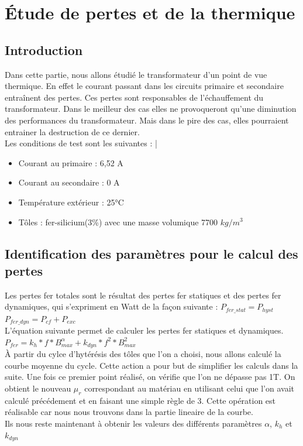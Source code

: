  
\section{Étude de pertes et de la thermique}

\subsection{Introduction}

	Dans cette partie, nous allons étudié le transformateur d'un point de vue thermique. En effet le courant passant dans les circuits primaire et secondaire entraînent des pertes. Ces pertes sont responsables de l'échauffement du transformateur. Dans le meilleur des cas elles ne provoqueront qu'une diminution des performances du transformateur. Mais dans le pire des cas, elles pourraient entrainer la destruction de ce dernier. \\
	Les conditions de test sont les suivantes : 
|\begin{itemize}
\item Courant au primaire : 6,52 A
\item Courant au secondaire  : 0 A
\item Température extérieur :  25°C
\item Tôles : fer-silicium(3\%) avec une masse volumique 7700 $kg/m^3$
\end{itemize}


\subsection{Identification des paramètres pour le calcul des pertes}

Les pertes fer totales sont le résultat des pertes fer statiques et des pertes fer dynamiques, qui s'expriment en Watt de la façon suivante :
		$ P_{fer\_stat} = P_{hyst}$\\
		$ P_{fer\_dyn} = P_{cf} + P_{exc}$\\

L'équation suivante permet de calculer les pertes fer statiques et dynamiques.\\
$ P_{fer} = k_h*f*B_{max}^{\alpha} + k_{dyn}*f^2*B_{max}^2$\\
  

	À partir du cylce d'hytérésis des tôles que l'on a choisi, nous allons calculé la courbe moyenne du cycle. Cette action a pour but de simplifier les calculs dans la suite. Une fois ce premier point réalisé, on vérifie que l'on ne dépasse pas 1T. On obtient le nouveau $\mu_r$ correspondant au matériau en utilisant celui que l'on avait calculé précédement et en faisant une simple règle de 3. Cette opération est réalisable car nous nous trouvons dans la partie lineaire de la courbe.\\
Ils nous reste maintenant à obtenir les valeurs des différents paramètres  $\alpha$, $k_h$ et $k_{dyn}$\\

